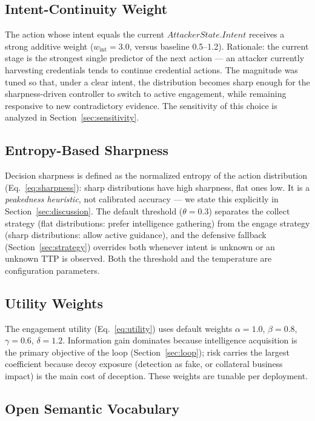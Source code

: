 \documentclass[preprints,article,accept,oneauthor]{Definitions/mdpi}
\begin{document}
\subsection{Intent-Continuity Weight}

The action whose intent equals the current $\mathit{AttackerState.Intent}$
receives a strong additive weight ($w_{\mathrm{int}} = 3.0$, versus baseline
0.5--1.2). Rationale: the current stage is the strongest single predictor of
the next action --- an attacker currently harvesting credentials tends to
continue credential actions. The magnitude was tuned so that, under a clear
intent, the distribution becomes sharp enough for the sharpness-driven
controller to switch to active engagement, while remaining responsive to new
contradictory evidence. The sensitivity of this choice is analyzed in
Section~\ref{sec:sensitivity}.

\subsection{Entropy-Based Sharpness}

Decision sharpness is defined as the normalized entropy of the action
distribution (Eq.~\ref{eq:sharpness}): sharp distributions have high
sharpness, flat ones low. It is a \textit{peakedness heuristic}, not
calibrated accuracy --- we state this explicitly in Section~\ref{sec:discussion}.
The default threshold ($\theta = 0.3$) separates the collect strategy (flat
distributions: prefer intelligence gathering) from the engage strategy
(sharp distributions: allow active guidance), and the defensive fallback
(Section~\ref{sec:strategy}) overrides both whenever intent is unknown or an
unknown TTP is observed. Both the threshold and the temperature are
configuration parameters.

\subsection{Utility Weights}

The engagement utility (Eq.~\ref{eq:utility}) uses default weights
$\alpha=1.0$, $\beta=0.8$, $\gamma=0.6$, $\delta=1.2$. Information gain
dominates because intelligence acquisition is the primary objective of the
loop (Section~\ref{sec:loop}); risk carries the largest coefficient because decoy
exposure (detection as fake, or collateral business impact) is the main cost
of deception. These weights are tunable per deployment.

\subsection{Open Semantic Vocabulary}
\label{sec:open-vocab}
\end{document}
